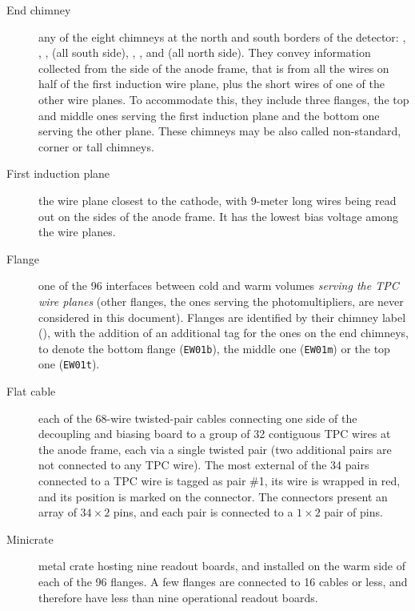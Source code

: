 \begin{description}
  \item[End chimney]
    any of the eight chimneys at the north and south borders of the detector:
    , , ,  (all south side),
    , ,  and  (all north side).
    They convey information collected from the side of the anode frame, that is
    from all the wires on half of the first induction wire plane,
    plus the short wires of one of the other wire planes.
    To accommodate this, they include three flanges, the top and middle ones
    serving the first induction plane and the bottom one serving the other plane.
    These chimneys may be also called non-standard, corner or tall chimneys.

  \item[First induction plane]
    the wire plane closest to the cathode,
    with 9-meter long wires being read out on the sides of the anode frame.
    It has the lowest bias voltage among the wire planes.

  \item[Flange]
    one of the 96 interfaces between cold and warm volumes
    \emph{serving the TPC wire planes}
    (other flanges, \eg the ones serving the photomultipliers, are never
    considered in this document).
    Flanges are identified by their chimney label (\eg {}), with the
    addition of an additional tag for the ones on the end chimneys,
    to denote the bottom flange (\texttt{EW01b}),
    the middle one (\texttt{EW01m}) or the top one (\texttt{EW01t}).

  \item[Flat cable]
    each of the 68-wire twisted-pair cables connecting one side
    of the decoupling and biasing board to a group of 32 contiguous TPC wires
    at the anode frame, each via a single twisted pair (two additional pairs are
    not connected to any TPC wire). The most external of the 34 pairs connected
    to a TPC wire is tagged as pair \#1, its wire is wrapped in red, and its
    position is marked on the connector. The connectors present an array of
    $34 \times 2$ pins, and each pair is connected to a $1 \times 2$ pair of
    pins.

  \item[Minicrate]
    metal crate hosting nine readout boards,
    and installed on the warm side of each of the 96 flanges.
    A few flanges are connected to 16 cables or less, and therefore have
    less than nine operational readout boards.


\end{description}
